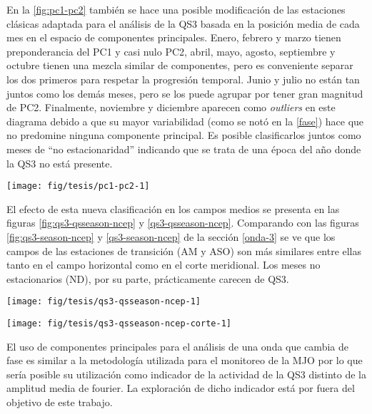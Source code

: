 \documentclass[spanish,a4paper]{book}
\begin{document}
En la \autoref{fig:pc1-pc2} también se hace una posible modificación de
las estaciones clásicas adaptada para el análisis de la QS3 basada en la
posición media de cada mes en el espacio de componentes principales.
Enero, febrero y marzo tienen preponderancia del PC1 y casi nulo PC2,
abril, mayo, agosto, septiembre y octubre tienen una mezcla similar de
componentes, pero es conveniente separar los dos primeros para respetar
la progresión temporal. Junio y julio no están tan juntos como los demás
meses, pero se los puede agrupar por tener gran magnitud de PC2.
Finalmente, noviembre y diciembre aparecen como \emph{outliers} en este
diagrama debido a que su mayor variabilidad (como se notó en la
\autoref{fase}) hace que no predomine ninguna componente principal. Es
posible clasificarlos juntos como meses de ``no estacionaridad''
indicando que se trata de una época del año donde la QS3 no está
presente.

\begin{figure*}
\texttt{[image: fig/tesis/pc1-pc2-1]} \caption{Valor medio de las dos primeras componentes principales del campo de QS3 - fig:pc1-pc2}\label{fig:pc1-pc2}
\end{figure*}

El efecto de esta nueva clasificación en los campos medios se presenta
en las figuras \ref{fig:qs3-qsseason-ncep} y \ref{qs3-qsseason-ncep}.
Comparando con las figuras \ref{fig:qs3-season-ncep} y
\ref{qs3-season-ncep} de la sección \ref{onda-3} se ve que los campos de
las estaciones de transición (AM y ASO) son más similares entre ellas
tanto en el campo horizontal como en el corte meridional. Los meses no
estacionarios (ND), por su parte, prácticamente carecen de QS3.

\begin{figure*}
\texttt{[image: fig/tesis/qs3-qsseason-ncep-1]} \caption{Media de reconstrucción de onda 3 en 300hPa - fig:qs3-qsseason-ncep}\label{fig:qs3-qsseason-ncep}
\end{figure*}

\begin{figure*}
\texttt{[image: fig/tesis/qs3-qsseason-ncep-corte-1]} \caption{Corte - fig:qs3-qsseason-ncep-corte}\label{fig:qs3-qsseason-ncep-corte}
\end{figure*}

El uso de componentes principales para el análisis de una onda que
cambia de fase es similar a la metodología utilizada para el monitoreo
de la MJO por lo que sería posible su utilización como
indicador de la actividad de la QS3 distinto de la amplitud media de
fourier. La exploración de dicho indicador está por fuera del objetivo
de este trabajo.
\end{document}
